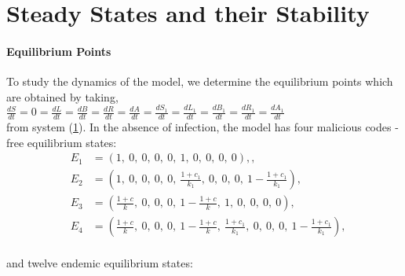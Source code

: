 
\section{Steady States and their Stability}
\paragraph* {Equilibrium Points}
To study the dynamics of the model, we determine the equilibrium points which are obtained by taking,\\
 $ \frac{dS}{dt} = 0 = \frac{dL}{dt} = \frac{dB}{dt} = \frac{dR}{dt} = \frac{dA}{dt}=\frac{d{S_1}}{dt}=\frac{d{L_1}}{dt}= \frac{d{B_1}}{dt}=\frac{d{R_1}}{dt}=\frac{d{A_1}}{dt} $  \\
 from system (\ref{}). In the absence of infection, the model has four malicious codes - free equilibrium states:\\

\begin{align}

& E_{1} &= \left( 1,\ 0,\ 0,\ 0,\ 0,\ 1, \ 0, \ 0, \ 0, \ 0 \right), \label{eq:E1},\\

& E_{2} &= \left( 1,\ 0,\ 0,\ 0,\ 0,\ \frac{1+c_1}{k_1}, \ 0, \ 0, \ 0, \ 1- \frac{1+c_1}{k_1} \right), \label{eq:E2}\\

& E_{3} &= \left( \frac{1+c}{k},\ 0,\ 0,\ 0,\ 1- \frac{1+c}{k},\ 1, \ 0, \ 0, \ 0, \ 0 \right), \label{eq:E3}\\

& E_{4} &= \left( \frac{1+c}{k},\ 0,\ 0,\ 0,\ 1- \frac{1+c}{k},\ \frac{1+c_1}{k_1}, \ 0, \ 0, \ 0, \ 1- \frac{1+c_1}{k_1} \right), \label{eq:E4}\\
\end{align}

and twelve endemic equilibrium states:\\

